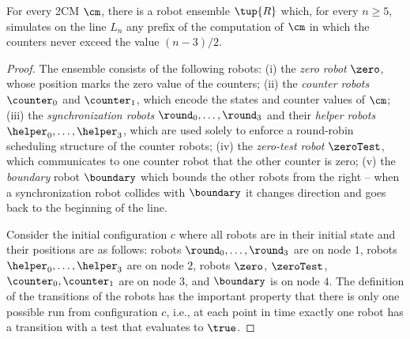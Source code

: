 \begin{theorem} \label{thm:PVPundec}
For every 2CM $\cm$, there is a robot ensemble $\tup{R}$ which, for every $n \geq 5$, simulates on the line $L_n$ any prefix of the computation of $\cm$ in which the counters never exceed the value $(n-3)/2$.
\end{theorem}
\begin{proof}
The ensemble consists of the following robots:
(i) the \emph{zero robot} $\zero$, whose position marks the zero value of the counters;
(ii) the \emph{counter robots} $\counter_0$ and $\counter_1$, which encode the states and counter values of $\cm$;
(iii) the \emph{synchronization robots} $\round_0,\ldots,\round_3$ and their \emph{helper robots} $\helper_0,\ldots,\helper_3$, which are used solely to enforce a round-robin scheduling structure of the counter robots;
(iv) the \emph{zero-test robot} $\zeroTest$, which communicates to one counter robot that the other counter is zero;
(v) the \emph{boundary} robot $\boundary$ which bounds the other robots from the right -- when a synchronization robot collides with $\boundary$ it changes direction and goes back to the beginning of the line.

Consider the initial configuration $c$ where all robots are in their initial state and their positions are as follows: robots $\round_0,\ldots,\round_3$ are on node $1$, robots $\helper_0,\ldots,\helper_3$ are on node $2$, robots $\zero$, $\zeroTest$, $\counter_0, \counter_1$ are on node $3$, and $\boundary$ is on node $4$.
The definition of the transitions of the robots has the important property that there is
only one possible run from configuration $c$, i.e., at each point in time exactly one robot has a transition with a test that evaluates to $\true$.


\end{proof}
